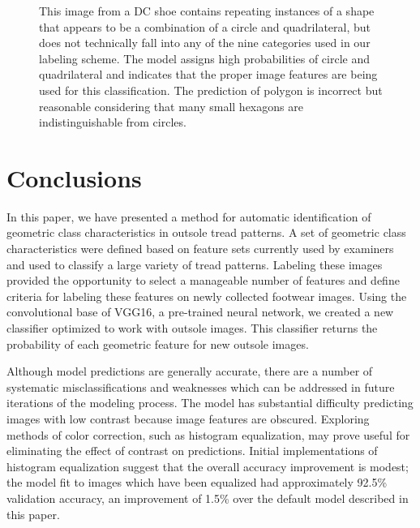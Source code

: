 \documentclass{article}\usepackage[]{graphicx}\usepackage[table]{xcolor}
\newenvironment{knitrout}{}{} %
\begin{document}
\begin{knitrout}
\begin{figure}[!p]
{}

\caption{This image from a DC shoe contains repeating instances of a shape that appears to be a combination of a circle and quadrilateral, but does not technically fall into any of the nine categories used in our labeling scheme. The model assigns high probabilities of circle and quadrilateral and indicates that the proper image features are being used for this classification. The prediction of polygon is incorrect but reasonable considering that many small hexagons are indistinguishable from circles.\label{fig:dc-heatmap}}\label{fig:current-heatmaps}
\end{figure}


\end{knitrout}












\section{Conclusions}

In this paper, we have presented a method for automatic identification of geometric class characteristics in outsole tread patterns. A set of geometric class characteristics were defined based on feature sets currently used by examiners and used to classify a large variety of tread patterns. Labeling these images provided the opportunity to select a manageable number of features and define criteria for labeling these features on newly collected footwear images. Using the convolutional base of VGG16, a pre-trained neural network, we created a new classifier optimized to work with outsole images. This classifier returns the probability of each geometric feature for new outsole images.

Although model predictions are generally accurate, there are a number of systematic misclassifications and weaknesses which can be addressed in future iterations of the modeling process. The model has substantial difficulty predicting images with low contrast because image features are obscured. Exploring methods of color correction, such as histogram equalization, may prove useful for eliminating the effect of contrast on predictions. Initial implementations of histogram equalization suggest that the overall accuracy improvement is modest; the model fit to images which have been equalized had approximately 92.5\% validation accuracy, an improvement of 1.5\% over the default model described in this paper.
\end{document}
